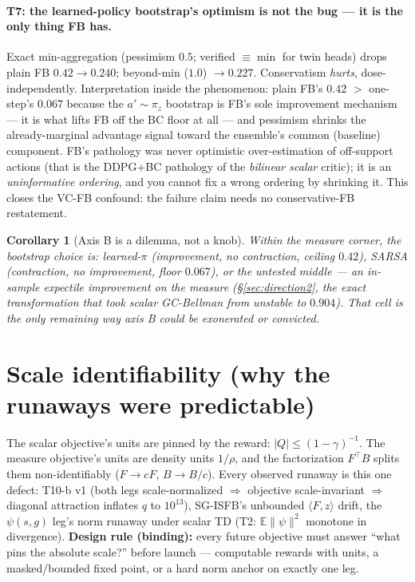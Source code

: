 \documentclass[11pt]{article}
\newcommand{\E}{\mathbb{E}}
\newtheorem{corollary}{Corollary}
\theoremstyle{definition}
\theoremstyle{remark}
\begin{document}
\paragraph{T7: the learned-policy bootstrap's optimism is not the bug --- it is the only
thing FB has.} Exact min-aggregation (pessimism $0.5$; verified $\equiv\min$ for twin heads)
drops plain FB $0.42\to\mathbf{0.240}$; beyond-min ($1.0$) $\to0.227$. Conservatism
\emph{hurts}, dose-independently. Interpretation inside the phenomenon: plain FB's $0.42$
$>$ one-step's $0.067$ because the $a'\sim\pi_z$ bootstrap is FB's sole improvement
mechanism --- it is what lifts FB off the BC floor at all --- and pessimism shrinks the
already-marginal advantage signal toward the ensemble's common (baseline) component. FB's
pathology was never optimistic over-estimation of off-support actions (that is the DDPG+BC
pathology of the \emph{bilinear scalar} critic); it is an \emph{uninformative ordering}, and
you cannot fix a wrong ordering by shrinking it. This closes the VC-FB confound: the failure
claim needs no conservative-FB restatement.

\begin{corollary}[Axis B is a dilemma, not a knob]\label{cor:dilemma}
Within the measure corner, the bootstrap choice is: learned-$\pi$ (improvement, no
contraction, ceiling $0.42$), SARSA (contraction, no improvement, floor $0.067$), or the
untested middle --- an \emph{in-sample expectile improvement on the measure}
(\S\ref{sec:direction2}, the exact transformation that took scalar GC-Bellman from unstable
to $0.904$). That cell is the only remaining way axis B could be exonerated or convicted.
\end{corollary}

\section{Scale identifiability (why the runaways were predictable)}\label{sec:scale}

The scalar objective's units are pinned by the reward: $|Q|\le(1-\gamma)^{-1}$. The measure
objective's units are density units $1/\rho$, and the factorization $F^\top B$ splits them
non-identifiably ($F\to cF$, $B\to B/c$). Every observed runaway is this one defect: T10-b
v1 (both legs scale-normalized $\Rightarrow$ objective scale-invariant $\Rightarrow$ diagonal
attraction inflates $q$ to $10^{13}$), SG-ISFB's unbounded $\langle F,z\rangle$ drift, the
$\psi(s,g)$ leg's norm runaway under scalar TD (T2: $\E\|\psi\|^2$ monotone in divergence).
\textbf{Design rule (binding):} every future objective must answer ``what pins the absolute
scale?'' before launch --- computable rewards with units, a masked/bounded fixed point, or a
hard norm anchor on exactly one leg.
\end{document}
